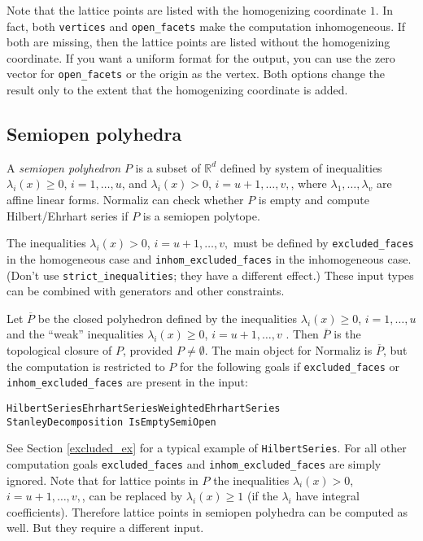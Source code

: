 \documentclass[12pt,a4paper]{scrartcl}
\theoremstyle{definition}
\def\RR{{\mathbb R}}
\begin{document}
{	Note that the lattice points are listed with the homogenizing coordinate $1$. In fact, both \verb|vertices| and \verb|open_facets| make the computation inhomogeneous. If both are missing, then the lattice points are listed without the homogenizing coordinate. If you want a uniform format for the output, you can use the zero vector for \verb|open_facets| or the origin as the vertex. Both options change the result only to the extent that the homogenizing coordinate is added.
	
	\subsection{Semiopen polyhedra}\label{semi_open}
	
	A \emph{semiopen polyhedron} $P$ is a subset of $\RR^d$ defined by system of inequalities $\lambda_i(x)\ge 0$, $i=1,\dots,u$, and  $\lambda_i(x)> 0$,  $i=u+1,\dots,v,$, where $\lambda_1,\dots,\lambda_v$ are affine linear forms. Normaliz can check whether $P$ is empty and compute Hilbert/Ehrhart series if $P$ is a semiopen polytope.
	
	The inequalities $\lambda_i(x)> 0$,  $i=u+1,\dots,v,$ must be defined by \verb|excluded_faces| in the homogeneous case and \verb|inhom_excluded_faces| in the inhomogeneous case. (Don't use \verb|strict_inequalities|; they have a different effect.) These input types can be combined with generators and other constraints.
	
	Let $\overline P$ be the closed polyhedron defined by the inequalities $\lambda_i(x)\ge 0$, $i=1,\dots,u$ and the ``weak'' inequalities $\lambda_i(x)\ge 0$, $i=u+1,\dots,v$ . Then $\overline P$ is the topological closure of $P$, provided $P\neq\emptyset$. The main object for Normaliz is $\overline P$, but the computation is restricted to $P$ for the following goals if \verb|excluded_faces| or \verb|inhom_excluded_faces| are present in the input:
	\begin{center}
		\texttt{HilbertSeries\quad EhrhartSeries\quad WeightedEhrhartSeries\\ StanleyDecomposition \quad IsEmptySemiOpen}	
	\end{center}
	See Section \ref{excluded_ex} for a typical example of \verb|HilbertSeries|. For all other computation goals \verb|excluded_faces| and \verb|inhom_excluded_faces| are simply ignored. Note that for lattice points in $P$  the inequalities $\lambda_i(x)> 0$,  $i=u+1,\dots,v,$, can be replaced by $\lambda_i(x)\ge 1$ (if the $\lambda_i$ have integral coefficients). Therefore lattice points in semiopen polyhedra can be computed as well. But they require a different input.
	
}
\end{document}
